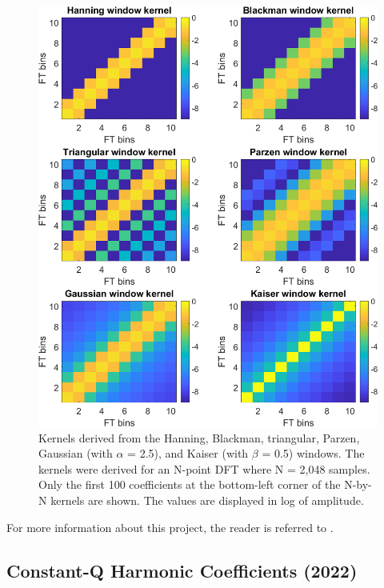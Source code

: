 \documentclass{article}
\begin{document}
\begin{figure}[!htb]
\centering
\includegraphics[width=\columnwidth]{Images/kernels.png}
\caption{Kernels derived from the Hanning, Blackman, triangular, Parzen, Gaussian (with $\alpha$ = 2.5), and Kaiser (with $\beta$ = 0.5) windows. The kernels were derived for an N-point DFT where N = 2,048 samples. Only the first 100 coefficients at the bottom-left corner of the N-by-N kernels are shown. The values are displayed in log of amplitude.}
\label{fig:kernels}
\end{figure}

For more information about this project, the reader is referred to \cite{article_rafii_nov2018}.


\subsection{Constant-Q Harmonic Coefficients (2022)}
\label{ssec:cqhc}
\end{document}
